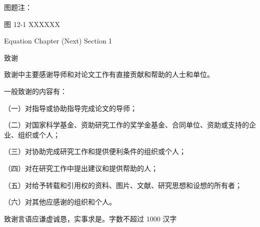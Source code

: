 \documentclass[UTF8, scheme=chinese, openany, oneside]{ctexbook}
\renewcommand{\headrulewidth}{0.4pt}
\renewcommand{\headrulewidth}{0.4pt}
\renewcommand{\headrulewidth}{0.4pt}
\renewcommand{\headrulewidth}{0.4pt}
\renewcommand{\headrulewidth}{0.4pt}
\renewcommand{\headrulewidth}{0.4pt}
\renewcommand{\headrulewidth}{0.6pt}
\renewcommand{\headrulewidth}{0.6pt}
\begin{document}
\vspace{3.5cm}

\noindent \hspace{2em} 图题注：

\vspace{0.8cm}

\begin{center}
     图 12-1 \quad XXXXXX
\end{center}

\newpage
{}
\vspace*{5cm}
\begin{center}
    {\color{white} Equation Chapter (Next) Section 1}
\end{center}
\backmatter
\pagestyle{backmatterstyle}


\pagestyle{fancy}
\fancyhf{}
\fancyfoot[C]{\thepage}
\renewcommand{\headrulewidth}{0.4pt}

\vspace*{0.3cm}
\begin{center}
    {\sffamily 致\quad 谢}
\end{center}
\vspace{0.5cm}

{
致谢中主要感谢导师和对论文工作有直接贡献和帮助的人士和单位。

一般致谢的内容有：

（一）对指导或协助指导完成论文的导师；

（二）对国家科学基金、资助研究工作的奖学金基金、合同单位、资助或支持的企业、组织或个人；

（三）对协助完成研究工作和提供便利条件的组织或个人；

（四）对在研究工作中提出建议和提供帮助的人；

（五）对给予转载和引用权的资料、图片、文献、研究思想和设想的所有者；

（六）对其他应感谢的组织和个人。

致谢言语应谦虚诚恳，实事求是。字数不超过 1000 汉字

\vspace{2cm}

}
\end{document}
